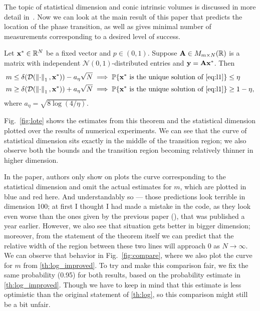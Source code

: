 The topic of statistical dimension and conic intrinsic volumes is discussed in more detail in~\cite{statdim}.
Now we can look at the main result of this paper that predicts the location of the phase transition, as well as gives
minimal number of measurements corresponding to a desired level of success.
\begin{theorem}
    Let $\mathbf{x}^* \in \mathbb{R}^N$ be a fixed vector and $p \in (0, 1)$.
    Suppose $\mathbf{A} \in M_{m \times N}(\mathbb{R})$ is a matrix with independent $\mathcal{N}(0,1)$-distributed entries and
    $\mathbf{y} = \mathbf{A} \mathbf{x}^*$.
    Then
    \begin{align*}
        & m \leq \delta(\mathcal{D}(\left\Vert\cdot\right\Vert_1, \mathbf{x}^*)) - a_\eta \sqrt{N} \implies
        \mathbb{P}\{\mathbf{x}^* \text{ is the unique solution of \ref{eq:l1}}\} \leq \eta
        \\
        & m \geq \delta(\mathcal{D}(\left\Vert\cdot\right\Vert_1, \mathbf{x}^*)) + a_\eta \sqrt{N} \implies
        \mathbb{P}\{\mathbf{x}^* \text{ is the unique solution of \ref{eq:l1}}\} \geq 1 - \eta,
    \end{align*}
    where $a_\eta = \sqrt{8 \log (4/\eta)}$.
    \label{th:lote}
\end{theorem}

Fig.~\ref{fig:lote} shows the estimates from this theorem and the statistical dimension plotted over
the results of numerical experiments.
We can see that the curve of statistical dimension sits exactly in the middle of the transition region;
we also observe both the bounds and the transition region becoming relatively thinner in higher dimension.

\begin{remark}
    In the paper, authors only show on plots the curve corresponding to the statistical dimension and omit the actual estimates for $m$,
    which are plotted in blue and red here.
    And understandably so --- those predictions look terrible in dimension 100; at first I thought I had made a mistake in the code, as
    they look even worse than the ones given by the previous paper (\cite{convexgeom}), that was published a year earlier.
    However, we also see that situation gets better in bigger dimension; moreover, from the statement of the theorem itself we can
    predict that the relative width of the region between these two lines will approach 0 as $N \to \infty$.
    We can observe that behavior in Fig.~\ref{fig:compare}, where we also plot the curve for $m$ from \ref{th:log_improved}.
    To try and make this comparison fair, we fix the same probability (0.95) for both results, based on the probability
    estimate in \ref{th:log_improved}.
    Though we have to keep in mind that this estimate is less optimistic than the original statement of \ref{th:log},
    so this comparison might still be a bit unfair.
\end{remark}

